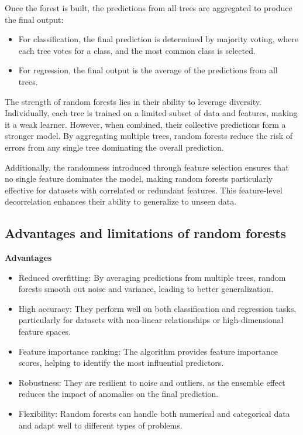 \documentclass[
  11pt,
]{book}
\providecommand{\tightlist}{%
  \setlength{\itemsep}{0pt}\setlength{\parskip}{0pt}}
\theoremstyle{definition}
\theoremstyle{definition}
\theoremstyle{definition}
\theoremstyle{definition}
\theoremstyle{remark}
\begin{document}
Once the forest is built, the predictions from all trees are aggregated to produce the final output:

\begin{itemize}
\tightlist
\item
  For classification, the final prediction is determined by majority voting, where each tree votes for a class, and the most common class is selected.\\
\item
  For regression, the final output is the average of the predictions from all trees.
\end{itemize}

The strength of random forests lies in their ability to leverage diversity. Individually, each tree is trained on a limited subset of data and features, making it a weak learner. However, when combined, their collective predictions form a stronger model. By aggregating multiple trees, random forests reduce the risk of errors from any single tree dominating the overall prediction.

Additionally, the randomness introduced through feature selection ensures that no single feature dominates the model, making random forests particularly effective for datasets with correlated or redundant features. This feature-level decorrelation enhances their ability to generalize to unseen data.

\subsection*{Advantages and limitations of random forests}\label{advantages-and-limitations-of-random-forests}


\textbf{Advantages}

\begin{itemize}
\tightlist
\item
  Reduced overfitting: By averaging predictions from multiple trees, random forests smooth out noise and variance, leading to better generalization.\\
\item
  High accuracy: They perform well on both classification and regression tasks, particularly for datasets with non-linear relationships or high-dimensional feature spaces.\\
\item
  Feature importance ranking: The algorithm provides feature importance scores, helping to identify the most influential predictors.\\
\item
  Robustness: They are resilient to noise and outliers, as the ensemble effect reduces the impact of anomalies on the final prediction.\\
\item
  Flexibility: Random forests can handle both numerical and categorical data and adapt well to different types of problems.
\end{itemize}
\end{document}
